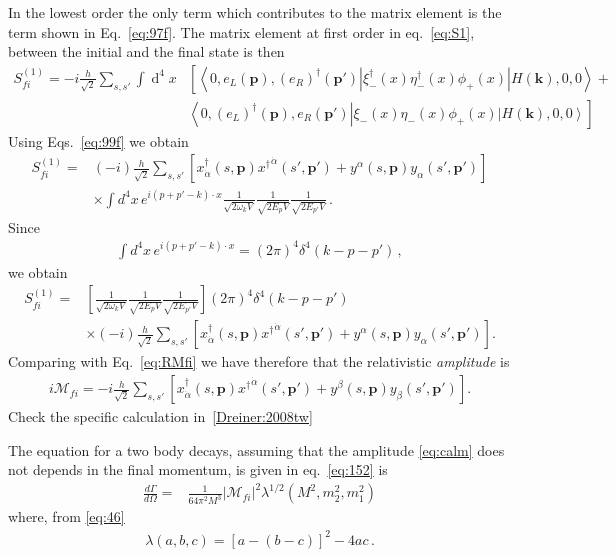 \begin{frame}
In the lowest order the only term which contributes to the matrix element is the term shown in Eq.~\eqref{eq:97f}.
The matrix element at first order in eq.~\eqref{eq:S1}, between the initial and the final state is then
\begin{align}
  S_{fi}^{(1)}=-i \frac{h}{\sqrt{2}} \sum_{s,s'} \int \operatorname{d}^4x &\left[ \left\langle 0, e_L(\boldsymbol{p}),\left( e_R \right)^{\dagger}(
\boldsymbol{p}') \left|\xi_-^{\dagger}(x)\eta_-^{\dagger}(x) \phi_{+}(x)  \right|H(\mathbf{k}),0,0 \right\rangle
   \right. +\nonumber\\
&\left.\left\langle 0,\left( e_L \right)^{\dagger}(\boldsymbol{p}), e_R (\boldsymbol{p}') \right|\xi_-(x)\eta_-(x) \phi_{+}(x)  \left|H(\mathbf{k}),0,0 \right\rangle \right] 
\end{align}
Using Eqs.~\eqref{eq:99f}  we obtain
\begin{align}
  S_{fi}^{(1)}=&(-i )\frac{h}{\sqrt{2}}  \sum_{s,s'}\left[ x^{\dagger}_{\dot{\alpha}}(s,\boldsymbol{p}){x^{\dagger}}^{\dot{\alpha}}(s',\boldsymbol{p}')+y^{\alpha}(s,\boldsymbol{p})y_{\alpha}(s',\boldsymbol{p}') \right] \nonumber\\
&\times\int d^4x\,e^{i(p+p'-k)\cdot x}\frac{1}{\sqrt{2\omega_k V}}\frac{1}{\sqrt{2E_p V}}\frac{1}{\sqrt{2E_{p'} V}}\,.
\end{align}
Since
\begin{align}
  \int d^4x\,e^{i(p+p'-k)\cdot x}=(2\pi)^4\delta^4(k-p-p')\,,
\end{align}
we obtain
\begin{align}
  S_{fi}^{(1)}=&\left[\frac{1}{\sqrt{2\omega_k V}}\frac{1}{\sqrt{2E_p V}}\frac{1}{\sqrt{2E_{p'} V}}\right]
(2\pi)^4\delta^4(k-p-p') \nonumber\\
&\times(-i )\frac{h}{\sqrt{2}}\sum_{s,s'}\left[ x^{\dagger}_{\dot{\alpha}}(s,\boldsymbol{p}){x^{\dagger}}^{\dot{\alpha}}(s',\boldsymbol{p}')+y^{\alpha}(s,\boldsymbol{p})y_{\alpha}(s',\boldsymbol{p}') \right].
\end{align}
Comparing with Eq.~\eqref{eq:RMfi} we have therefore that the relativistic \emph{amplitude} is
\begin{align}
\label{eq:calm}
  i\mathcal{M}_{fi}=-i \frac{h}{\sqrt{2}}\sum_{s,s'}\left[ x^{\dagger}_{\dot{\alpha}}(s,\boldsymbol{p}){x^{\dagger}}^{\dot{\alpha}}(s',\boldsymbol{p}')+y^{\beta}(s,\boldsymbol{p})y_{\beta}(s',\boldsymbol{p}') \right].
\end{align}
Check the specific calculation in~\ref{Dreiner:2008tw}

The equation for a two body decays, assuming that the amplitude \eqref{eq:calm} does not depends in the final momentum,  is given in eq.~\eqref{eq:152} is 
\begin{align}
\label{eq:154pdn}
\frac{d\Gamma}{d\Omega}=
&\frac{1}{64 \pi^2M^3}\left|\mathcal{M}_{fi}\right|^2\lambda^{1/2}(M^2,m_2^2,m_1^2)
\end{align}
where, from \eqref{eq:46}
\begin{align}
\label{eq:46n}
  \lambda(a,b,c)=\left[ a-(b-c) \right]^2-4ac\,.
\end{align}


\end{frame}
